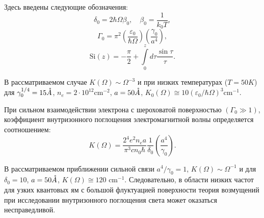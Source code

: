 Здесь введены следующие обозначения:
\[
\delta_0 = 2\hbar \Omega \beta_0, \quad \beta_0 = \frac{1}{k_0 T},
\]
\[
\Gamma_0 = \pi^2 \left(\frac{\varepsilon_0}{\hbar \Omega} \right) \left( \frac{\gamma_0}{a^4} \right),
\]
\[
\mathrm{Si}(z) = -\frac{\pi}{2} + \int\limits_0^z{d\tau\frac{\sin{\tau}}{\tau}}.
\]

В рассматриваемом случае $K(\Omega )\sim \Omega^{-3} $ и при низких температурах ($T=50 K$) для $\gamma_0^{1/4} =15 \AA$, $n_e = 2\cdot 10^{12} \text{cm}^{-2} $, $a=50 \AA$, $K_0 (\Omega )\cong 10\left(\varepsilon_0 / \hbar\Omega \right)^3 \text{cm}^{-1} $.

При сильном взаимодействии электрона с шероховатой поверхностью $\left( \Gamma_0 \gg 1 \right) $, коэффициент внутризонного поглощения электромагнитной волны определяется соотношением:
\begin{equation} \label{eq:syn_10}
K(\Omega )=\frac{2^4 e^2 n_e a}{\pi^3 cn_0 \hbar } \frac{1}{\delta_0 } \left(\frac{a^4 }{\gamma_0 } \right).
\end{equation} 

В рассматриваемом приближении сильной связи $a^4 /\gamma_0 =1$, $K(\Omega )\sim \Omega ^{-1} $ и для $\delta_0 =10$, $a=50 \AA$, $K(\Omega )\cong 120 \text{ cm}^{-1} $. Следовательно, в области низких частот для узких квантовых ям с большой флуктуацией поверхности теория возмущений при исследовании внутризонного поглощения света может оказаться несправедливой.

